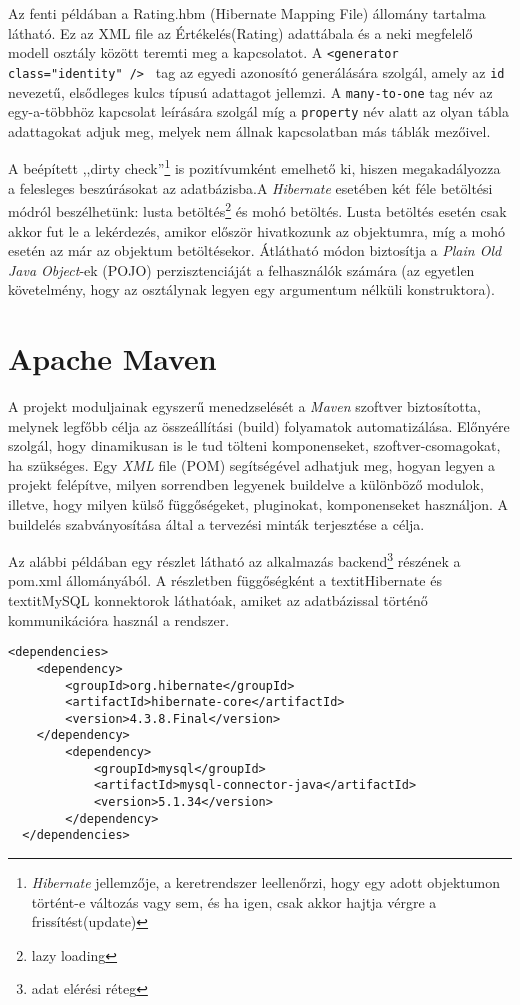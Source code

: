 \par 
Az fenti példában a Rating.hbm (Hibernate Mapping File) állomány tartalma látható. Ez az XML file az Értékelés(Rating) adattábala és a neki megfelelő modell osztály között teremti meg a kapcsolatot. A {\tt <generator class="identity" /> } tag az egyedi azonosító generálására szolgál, amely az {\tt id} nevezetű, elsődleges kulcs típusú adattagot jellemzi. A {\tt many-to-one} tag név az egy-a-többhöz kapcsolat leírására szolgál míg a {\tt  property} név alatt az olyan tábla adattagokat adjuk meg, melyek nem állnak kapcsolatban más táblák mezőivel.

\par A beépített ,,dirty check”\footnote{\textit{Hibernate} jellemzője, a keretrendszer leellenőrzi, hogy egy adott objektumon történt-e változás vagy sem, és ha igen, csak akkor hajtja vérgre a frissítést(update)} is pozitívumként emelhető ki, hiszen megakadályozza a felesleges beszúrásokat az adatbázisba.A \textit{Hibernate} esetében két féle betöltési módról beszélhetünk: lusta betöltés\footnote{lazy loading} és mohó betöltés. Lusta betöltés esetén csak akkor fut le a  lekérdezés, amikor először hivatkozunk az objektumra, míg a mohó esetén az már az objektum betöltésekor. Átlátható módon biztosítja a \textit{Plain Old Java Object}-ek (POJO) perzisztenciáját a felhasználók számára (az egyetlen követelmény, hogy az osztálynak legyen egy argumentum nélküli konstruktora).
%
\section{Apache Maven}\label{sec:FELH:am}

A projekt moduljainak egyszerű menedzselését a \textit{Maven} szoftver biztosította, melynek legfőbb célja az összeállítási (build)  folyamatok automatizálása. Előnyére szolgál, hogy dinamikusan is le tud tölteni komponenseket, szoftver-csomagokat, ha szükséges. Egy \textit{XML} file (POM) segítségével adhatjuk meg, hogyan legyen a projekt felépítve, milyen sorrendben legyenek buildelve a különböző modulok, illetve, hogy milyen külső függőségeket, pluginokat, komponenseket használjon. A buildelés szabványosítása által a tervezési minták terjesztése a célja.
\par Az alábbi példában egy részlet látható az alkalmazás backend\footnote{adat elérési réteg} részének a  pom.xml állományából. A részletben függőségként a textit{Hibernate} és textit{MySQL} konnektorok láthatóak, amiket az adatbázissal történő kommunikációra használ a rendszer.
\lstset{language=XML}
\begin{lstlisting}
<dependencies>
  	<dependency>
		<groupId>org.hibernate</groupId>
		<artifactId>hibernate-core</artifactId>
		<version>4.3.8.Final</version>
	</dependency>
		<dependency>
			<groupId>mysql</groupId>
			<artifactId>mysql-connector-java</artifactId>
			<version>5.1.34</version>
		</dependency>
  </dependencies>
\end{lstlisting}

